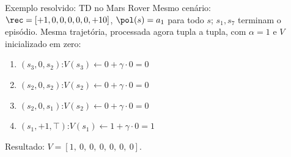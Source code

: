 \documentclass[aspectratio=169, 11pt]{beamer}
\begin{document}
\begin{frame}{Exemplo resolvido: TD no Mars Rover}
  Mesmo cenário: $\rec = [+1, 0, 0, 0, 0, 0, +10]$,
  $\pol(s) = a_1$ para todo $s$; $s_1, s_7$ terminam o episódio.
  Mesma trajetória, processada agora tupla a tupla, com $\alpha = 1$
  e $V$ inicializado em zero:

  \medskip
  \centering

  \medskip
  \raggedright
  \begin{enumerate}\setlength{\itemsep}{0.2ex}
    \item $(s_3, 0, s_2)$:\quad $V(s_3) \leftarrow 0 + \gamma\cdot 0 = 0$
    \item $(s_2, 0, s_2)$:\quad $V(s_2) \leftarrow 0 + \gamma\cdot 0 = 0$
    \item $(s_2, 0, s_1)$:\quad $V(s_2) \leftarrow 0 + \gamma\cdot 0 = 0$
    \item $(s_1, +1, \top)$:\quad $V(s_1) \leftarrow 1 + \gamma\cdot 0 = 1$
  \end{enumerate}

  Resultado: $V = [1,\ 0,\ 0,\ 0,\ 0,\ 0,\ 0]$.
\end{frame}
\end{document}
